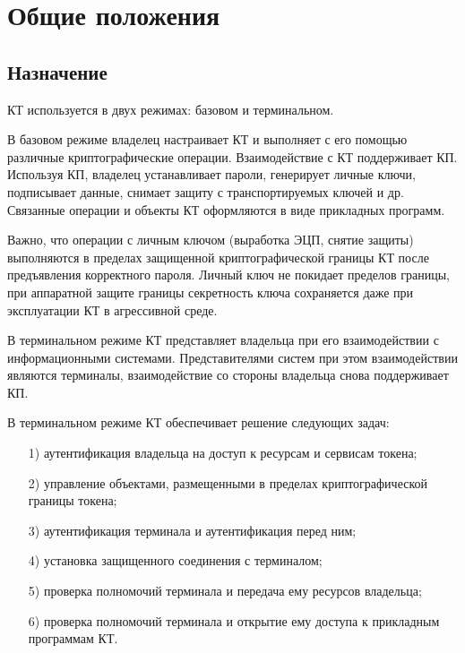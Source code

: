\chapter{Общие положения}\label{COMMON}

\section{Назначение}

КТ используется в двух режимах: базовом и терминальном.

В базовом режиме владелец настраивает КТ и выполняет с его помощью различные
криптографические операции. Взаимодействие с КТ поддерживает КП. 
Используя КП, владелец устанавливает пароли, генерирует личные ключи, 
подписывает данные, снимает защиту с транспортируемых ключей и др.
Связанные операции и объекты КТ оформляются в виде прикладных программ.


Важно, что операции с личным ключом (выработка ЭЦП, снятие защиты) выполняются  
в пределах защищенной криптографической границы КТ после предъявления 
корректного пароля. Личный ключ не покидает пределов границы, при аппаратной 
защите границы секретность ключа сохраняется даже при эксплуатации КТ в 
агрессивной среде.

В терминальном режиме КТ представляет владельца при его взаимодействии с 
информационными системами. Представителями систем при этом взаимодействии 
являются терминалы, взаимодействие со стороны владельца снова поддерживает КП. 

В терминальном режиме КТ обеспечивает решение следующих задач: 
\begin{enumerate}
\item[1)]
аутентификация владельца на доступ к ресурсам и сервисам токена; 
\item[2)]
управление объектами, размещенными в пределах криптографической границы токена;
\item[3)]
аутентификация терминала и аутентификация перед ним;
\item[4)]
установка защищенного соединения с терминалом;
\item[5)]
проверка полномочий терминала и передача ему ресурсов владельца;
\item[6)]
проверка полномочий терминала и открытие ему доступа к прикладным программам КТ. 
\end{enumerate}

